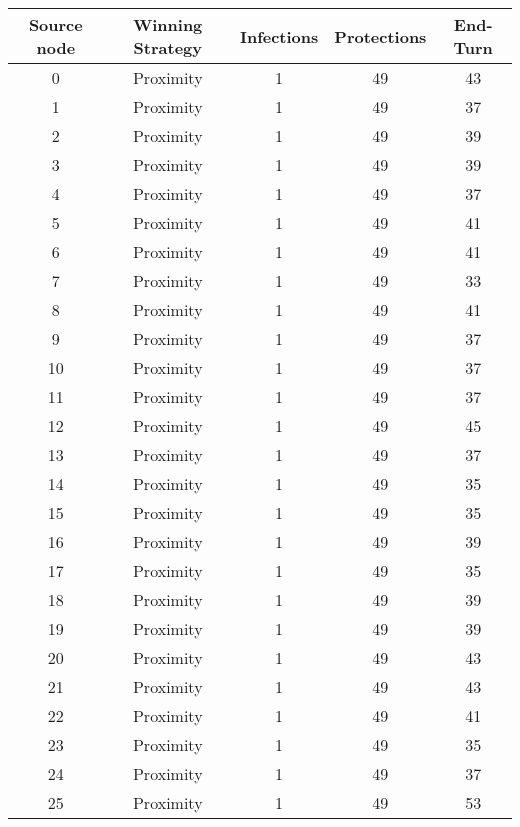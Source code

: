 \documentclass[results.tex]{subfiles}
\begin{document}
\begin{center}
  \begin{tabular}{| c || c | c | c | c |}
    \hline
    {\bfseries Source node} & {\bfseries Winning Strategy} & {\bfseries Infections} & {\bfseries Protections} & {\bfseries End-Turn} \\  %
    \hline\hline
    0 & Proximity & 1 & 49 & 43 \\ 
    \hline
    1 & Proximity & 1 & 49 & 37 \\ 
    \hline
    2 & Proximity & 1 & 49 & 39 \\ 
    \hline
    3 & Proximity & 1 & 49 & 39 \\ 
    \hline
    4 & Proximity & 1 & 49 & 37 \\ 
    \hline
    5 & Proximity & 1 & 49 & 41 \\ 
    \hline
    6 & Proximity & 1 & 49 & 41 \\ 
    \hline
    7 & Proximity & 1 & 49 & 33 \\ 
    \hline
    8 & Proximity & 1 & 49 & 41 \\ 
    \hline
    9 & Proximity & 1 & 49 & 37 \\ 
    \hline
    10 & Proximity & 1 & 49 & 37 \\ 
    \hline
    11 & Proximity & 1 & 49 & 37 \\ 
    \hline
    12 & Proximity & 1 & 49 & 45 \\ 
    \hline
    13 & Proximity & 1 & 49 & 37 \\ 
    \hline
    14 & Proximity & 1 & 49 & 35 \\ 
    \hline
    15 & Proximity & 1 & 49 & 35 \\ 
    \hline
    16 & Proximity & 1 & 49 & 39 \\ 
    \hline
    17 & Proximity & 1 & 49 & 35 \\ 
    \hline
    18 & Proximity & 1 & 49 & 39 \\ 
    \hline
    19 & Proximity & 1 & 49 & 39 \\ 
    \hline
    20 & Proximity & 1 & 49 & 43 \\ 
    \hline
    21 & Proximity & 1 & 49 & 43 \\ 
    \hline
    22 & Proximity & 1 & 49 & 41 \\ 
    \hline
    23 & Proximity & 1 & 49 & 35 \\ 
    \hline
    24 & Proximity & 1 & 49 & 37 \\ 
    \hline
    25 & Proximity & 1 & 49 & 53 \\ 

\end{tabular}
\end{center}
\end{document}
